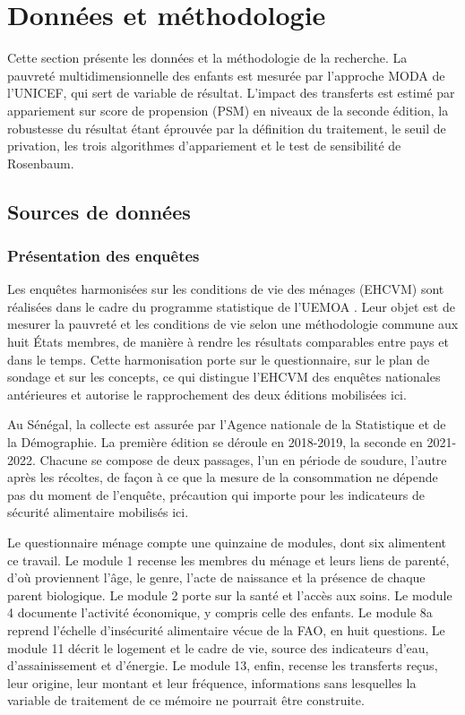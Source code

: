 \section{Données et méthodologie}
\label{sec:methodo}

Cette section présente les données et la méthodologie de la recherche. La
pauvreté multidimensionnelle des enfants est mesurée par l'approche MODA de
l'UNICEF, qui sert de variable de résultat. L'impact des transferts est
estimé par appariement sur score de propension (PSM) en niveaux de la
seconde édition, la robustesse du résultat étant éprouvée par la définition
du traitement, le seuil de privation, les trois algorithmes d'appariement
et le test de sensibilité de Rosenbaum.

\subsection{Sources de données}

\subsubsection{Présentation des enquêtes}

Les enquêtes harmonisées sur les conditions de vie des ménages (EHCVM) sont
réalisées dans le cadre du programme statistique de l'UEMOA
\parencite{ansd2019, ansd2022}. Leur objet est de mesurer la pauvreté et les
conditions de vie selon une méthodologie commune aux huit États membres, de
manière à rendre les résultats comparables entre pays et dans le temps. Cette
harmonisation porte sur le questionnaire, sur le plan de sondage et sur les
concepts, ce qui distingue l'EHCVM des enquêtes nationales antérieures et
autorise le rapprochement des deux éditions mobilisées ici.

Au Sénégal, la collecte est assurée par l'Agence nationale de la Statistique et
de la Démographie. La première édition se déroule en 2018-2019, la seconde en
2021-2022. Chacune se compose de deux passages, l'un en période de soudure,
l'autre après les récoltes, de façon à ce que la mesure de la consommation ne
dépende pas du moment de l'enquête, précaution qui importe pour les indicateurs
de sécurité alimentaire mobilisés ici.

Le questionnaire ménage compte une quinzaine de modules, dont six alimentent ce
travail. Le module 1 recense les membres du ménage et leurs liens de parenté,
d'où proviennent l'âge, le genre, l'acte de naissance et la présence de chaque
parent biologique. Le module 2 porte sur la santé et l'accès aux soins. Le
module 4 documente l'activité économique, y compris celle des enfants. Le module
8a reprend l'échelle d'insécurité alimentaire vécue de la FAO, en huit
questions. Le module 11 décrit le logement et le cadre de vie, source des
indicateurs d'eau, d'assainissement et d'énergie. Le module 13, enfin, recense
les transferts reçus, leur origine, leur montant et leur fréquence,
informations sans lesquelles la variable de traitement de ce mémoire ne
pourrait être construite.

